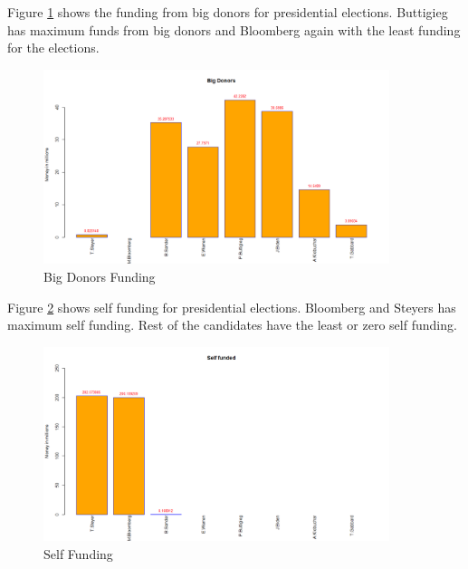 Figure \ref{Bigdonor} shows the funding from big donors for presidential elections. Buttigieg has maximum funds from big donors and Bloomberg again with the least funding for the elections. 
\begin{figure}[H]
    \centering
    \includegraphics[width=0.9\textwidth]{figures/Bigdonor.png}
    \caption{Big Donors Funding}
    \label{Bigdonor}
\end{figure}

Figure \ref{Selffunnded} shows self funding for presidential elections. Bloomberg and Steyers has maximum self funding. Rest of the candidates have the least or zero self funding. 
\begin{figure}[H]
    \centering
    \includegraphics[width=0.9\textwidth]{figures/Selffunnded.png}
    \caption{Self Funding}
    \label{Selffunnded}
\end{figure}

